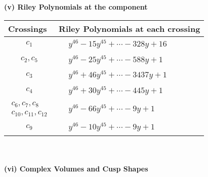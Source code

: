 \documentclass[1p]{elsarticle_modified}
\theoremstyle{definition}
\begin{document}
\newpage\renewcommand{\arraystretch}{1}
\flushleft \textbf{(v) Riley Polynomials at the component}\newline \\
\begin{tabular}{m{50pt}|m{274pt}}
Crossings & \hspace{64pt}Riley Polynomials at each crossing \\
\hline $$\begin{aligned}c_{1}\end{aligned}$$&$\begin{aligned}
&y^{46}-15 y^{45}+\cdots-328 y+16
\end{aligned}$\\
\hline $$\begin{aligned}c_{2},c_{5}\end{aligned}$$&$\begin{aligned}
&y^{46}-25 y^{45}+\cdots-588 y+1
\end{aligned}$\\
\hline $$\begin{aligned}c_{3}\end{aligned}$$&$\begin{aligned}
&y^{46}+46 y^{45}+\cdots-3437 y+1
\end{aligned}$\\
\hline $$\begin{aligned}c_{4}\end{aligned}$$&$\begin{aligned}
&y^{46}+30 y^{45}+\cdots-445 y+1
\end{aligned}$\\
\hline $$\begin{aligned}c_{6},c_{7},c_{8}\\c_{10},c_{11},c_{12}\end{aligned}$$&$\begin{aligned}
&y^{46}-66 y^{45}+\cdots-9 y+1
\end{aligned}$\\
\hline $$\begin{aligned}c_{9}\end{aligned}$$&$\begin{aligned}
&y^{46}-10 y^{45}+\cdots-9 y+1
\end{aligned}$\\
\hline
\end{tabular}\\~\\
\newpage\flushleft \textbf{(vi) Complex Volumes and Cusp Shapes}
\end{document}
